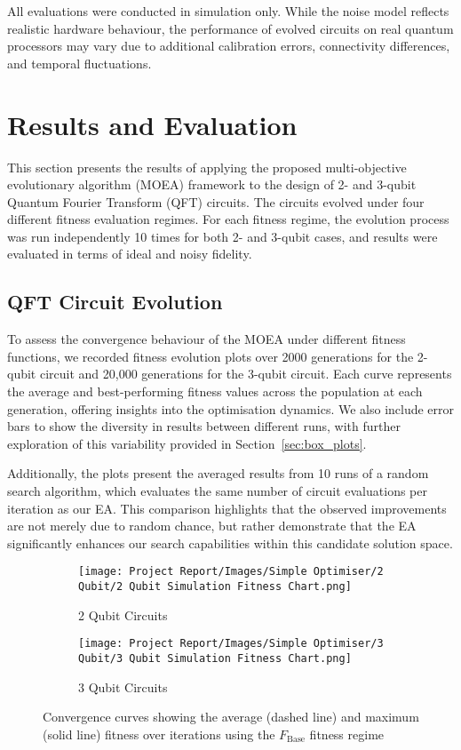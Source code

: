 \documentclass[11pt,a4paper]{article}
\begin{document}
All evaluations were conducted in simulation only. While the noise model reflects realistic hardware behaviour, the performance of evolved circuits on real quantum processors may vary due to additional calibration errors, connectivity differences, and temporal fluctuations.


%
%
\section{Results and Evaluation}\label{sec:results}
This section presents the results of applying the proposed multi-objective evolutionary algorithm (MOEA) framework to the design of 2- and 3-qubit Quantum Fourier Transform (QFT) circuits. The circuits evolved under four different fitness evaluation regimes. For each fitness regime, the evolution process was run independently 10 times for both 2- and 3-qubit cases, and results were evaluated in terms of ideal and noisy fidelity.

\subsection{QFT Circuit Evolution}
To assess the convergence behaviour of the MOEA under different fitness functions, we recorded fitness evolution plots over 2000 generations for the 2-qubit circuit and 20,000 generations for the 3-qubit circuit. Each curve represents the average and best-performing fitness values across the population at each generation, offering insights into the optimisation dynamics. We also include error bars to show the diversity in results between different runs, with further exploration of this variability provided in Section~\ref{sec:box_plots}.

Additionally, the plots present the averaged results from 10 runs of a random search algorithm, which evaluates the same number of circuit evaluations per iteration as our EA. This comparison highlights that the observed improvements are not merely due to random chance, but rather demonstrate that the EA significantly enhances our search capabilities within this candidate solution space.

\begin{figure}[H]
\centering
\begin{subfigure}{.5\textwidth}
  \centering
  \texttt{[image: Project Report/Images/Simple Optimiser/2 Qubit/2 Qubit Simulation Fitness Chart.png]}
  \caption{2 Qubit Circuits}
  \label{fig:simple_fitness_2q}
\end{subfigure}%
\begin{subfigure}{.5\textwidth}
  \centering
  \texttt{[image: Project Report/Images/Simple Optimiser/3 Qubit/3 Qubit Simulation Fitness Chart.png]}
  \caption{3 Qubit Circuits}
  \label{fig:simple_fitness_3q}
\end{subfigure}
\caption{Convergence curves showing the average (dashed line) and maximum (solid line) fitness over iterations using the $F_{\mathrm{Base}}$ fitness regime}
\label{fig:simple_fitness_charts}
\end{figure}
\end{document}
